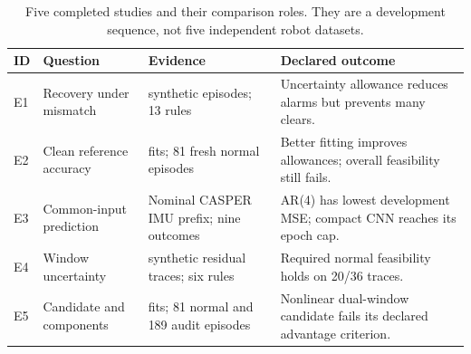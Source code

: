 \begin{table}[t]\centering
\caption{Five completed studies and their comparison roles. They are a development sequence, not five independent robot datasets.}\label{tab:studies}
\begin{tabular}{>{\raggedright\arraybackslash}p{}>{\raggedright\arraybackslash}p{}>{\raggedright\arraybackslash}p{}>{\raggedright\arraybackslash}p{}}\toprule
ID & Question & Evidence & Declared outcome\\\midrule
E1 & Recovery under mismatch & 216 synthetic episodes; 13 rules & Uncertainty allowance reduces alarms but prevents many clears.\\
E2 & Clean reference accuracy & 63 fits; 81 fresh normal episodes & Better fitting improves allowances; overall feasibility still fails.\\
E3 & Common-input prediction & Nominal CASPER IMU prefix; nine outcomes & AR(4) has lowest development MSE; compact CNN reaches its epoch cap.\\
E4 & Window uncertainty & 36 synthetic residual traces; six rules & Required normal feasibility holds on 20/36 traces.\\
E5 & Candidate and components & 30 fits; 81 normal and 189 audit episodes & Nonlinear dual-window candidate fails its declared advantage criterion.\\\bottomrule
\end{tabular}
\end{table}
